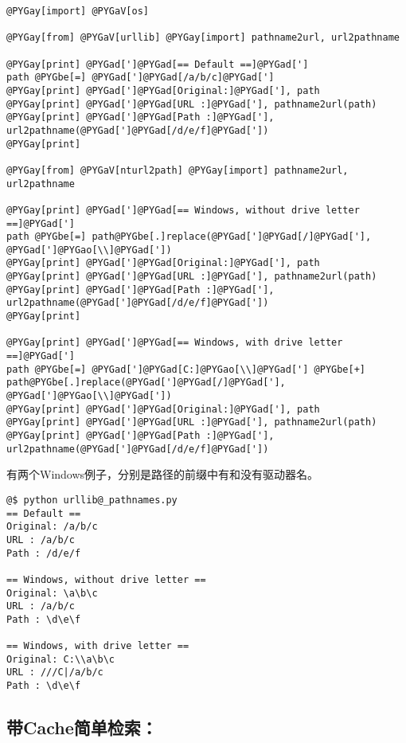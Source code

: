 \documentclass[a4paper,10pt,english]{manual}
\begin{document}
\begin{Verbatim}[commandchars=@\[\]]
@PYGay[import] @PYGaV[os]

@PYGay[from] @PYGaV[urllib] @PYGay[import] pathname2url, url2pathname

@PYGay[print] @PYGad[']@PYGad[== Default ==]@PYGad[']
path @PYGbe[=] @PYGad[']@PYGad[/a/b/c]@PYGad[']
@PYGay[print] @PYGad[']@PYGad[Original:]@PYGad['], path
@PYGay[print] @PYGad[']@PYGad[URL :]@PYGad['], pathname2url(path)
@PYGay[print] @PYGad[']@PYGad[Path :]@PYGad['], url2pathname(@PYGad[']@PYGad[/d/e/f]@PYGad['])
@PYGay[print]

@PYGay[from] @PYGaV[nturl2path] @PYGay[import] pathname2url, url2pathname

@PYGay[print] @PYGad[']@PYGad[== Windows, without drive letter ==]@PYGad[']
path @PYGbe[=] path@PYGbe[.]replace(@PYGad[']@PYGad[/]@PYGad['], @PYGad[']@PYGao[\\]@PYGad['])
@PYGay[print] @PYGad[']@PYGad[Original:]@PYGad['], path
@PYGay[print] @PYGad[']@PYGad[URL :]@PYGad['], pathname2url(path)
@PYGay[print] @PYGad[']@PYGad[Path :]@PYGad['], url2pathname(@PYGad[']@PYGad[/d/e/f]@PYGad['])
@PYGay[print]

@PYGay[print] @PYGad[']@PYGad[== Windows, with drive letter ==]@PYGad[']
path @PYGbe[=] @PYGad[']@PYGad[C:]@PYGao[\\]@PYGad['] @PYGbe[+] path@PYGbe[.]replace(@PYGad[']@PYGad[/]@PYGad['], @PYGad[']@PYGao[\\]@PYGad['])
@PYGay[print] @PYGad[']@PYGad[Original:]@PYGad['], path
@PYGay[print] @PYGad[']@PYGad[URL :]@PYGad['], pathname2url(path)
@PYGay[print] @PYGad[']@PYGad[Path :]@PYGad['], url2pathname(@PYGad[']@PYGad[/d/e/f]@PYGad['])
\end{Verbatim}

有两个Windows例子，分别是路径的前缀中有和没有驱动器名。

\begin{Verbatim}[commandchars=@\[\]]
@$ python urllib@_pathnames.py
== Default ==
Original: /a/b/c
URL : /a/b/c
Path : /d/e/f

== Windows, without drive letter ==
Original: \a\b\c
URL : /a/b/c
Path : \d\e\f

== Windows, with drive letter ==
Original: C:\\a\b\c
URL : ///C|/a/b/c
Path : \d\e\f
\end{Verbatim}


\subsection{带Cache简单检索：}
\end{document}
